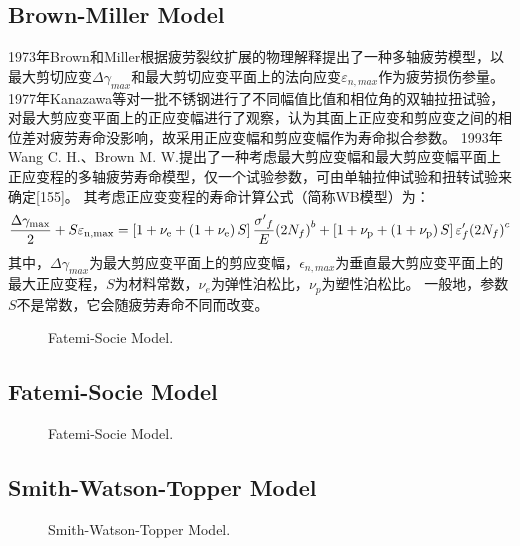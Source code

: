 \documentclass{article}
\begin{document}
\subsection{Brown-Miller Model}

1973年Brown和Miller\cite{Brown1973}根据疲劳裂纹扩展的物理解释提出了一种多轴疲劳模型，以最大剪切应变$\Delta\gamma_{max}$和最大剪切应变平面上的法向应变$\varepsilon_{n,max}$作为疲劳损伤参量。
1977年Kanazawa等\cite{KANAZAWA1979}对一批不锈钢进行了不同幅值比值和相位角的双轴拉扭试验，对最大剪应变平面上的正应变幅进行了观察，认为其面上正应变和剪应变之间的相位差对疲劳寿命没影响，故采用正应变幅和剪应变幅作为寿命拟合参数。
1993年Wang C. H.、Brown M. W.提出了一种考虑最大剪应变幅和最大剪应变幅平面上正应变程的多轴疲劳寿命模型，仅一个试验参数，可由单轴拉伸试验和扭转试验来确定[155]。
其考虑正应变变程的寿命计算公式（简称WB模型）为：
\[\frac{{\Delta {\gamma _{{\rm{max}}}}}}{2} + S{\varepsilon _{{\rm{n,max}}}} = \left[ {1 + {\nu _{\rm{e}}} + \left( {1 + {\nu _{\rm{e}}}} \right)S} \right]\frac{{{{\sigma '}_f}}}{E}{\left( {2{N_f}} \right)^b} + \left[ {1 + {\nu _{\rm{p}}} + \left( {1 + {\nu _{\rm{p}}}} \right)S} \right]{\varepsilon '_f}{\left( {2{N_f}} \right)^c}\]
其中，$\Delta\gamma_{max}$为最大剪应变平面上的剪应变幅，$\epsilon_{n,max}$为垂直最大剪应变平面上的最大正应变程，$S$为材料常数，$\nu_e$为弹性泊松比，$\nu_p$为塑性泊松比。
一般地，参数$S$不是常数，它会随疲劳寿命不同而改变。

\begin{figure}[!htp]
\caption{Fatemi-Socie Model.}
\label{Fig:NF-NP-TGMF-BM}
\end{figure}

\subsection{Fatemi-Socie Model}

\begin{figure}[!htp]
\caption{Fatemi-Socie Model.}
\label{Fig:NF-NP-TGMF-FS}
\end{figure}

\subsection{Smith-Watson-Topper Model}

\begin{figure}[!htp]
\caption{Smith-Watson-Topper Model.}
\label{Fig:NF-NP-TGMF-SWT}
\end{figure}
\end{document}
